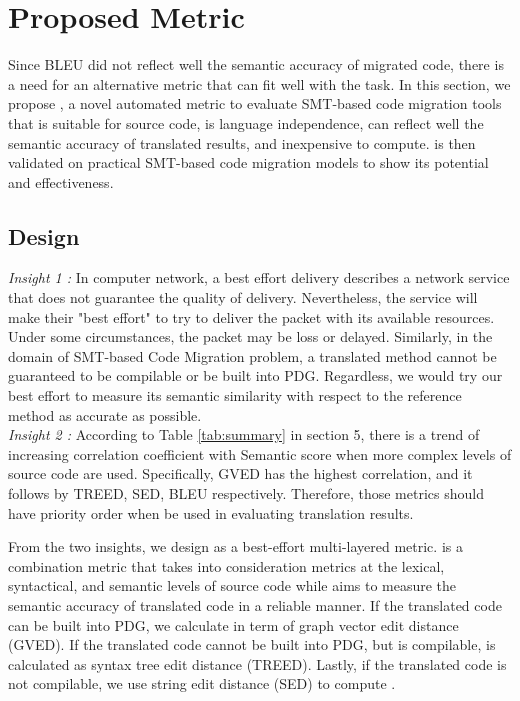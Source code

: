\section{Proposed Metric}
Since BLEU did not reflect well the semantic accuracy of migrated code, there is a need for an alternative metric that can fit well with the task. In this section, we propose {\model}, a novel automated metric to evaluate SMT-based code migration tools that is suitable for source code, is language independence, can reflect well the semantic accuracy of translated results, and inexpensive to compute. {\model} is then validated on practical SMT-based code migration models to show its potential and effectiveness. 
 
\subsection{Design}
\emph{Insight 1 :} In computer network, a best effort delivery describes a network service that does not guarantee the quality of delivery. Nevertheless, the service will make their "best effort" to try to deliver the packet with its available resources. Under some circumstances, the packet may be loss or delayed. Similarly, in the domain of SMT-based Code Migration problem, a translated method cannot be guaranteed to be compilable or be built into PDG. Regardless, we would try our best effort to measure its semantic similarity with respect to the reference method as accurate as possible. \\
\emph{Insight 2 :}
According to Table \ref{tab:summary} in section 5, there is a trend of increasing correlation coefficient with Semantic score when more complex levels of source code are used. Specifically, GVED has the highest correlation, and it follows by TREED, SED, BLEU respectively. Therefore, those metrics should have priority order when be used in evaluating translation results.  

From the two insights, we design {\model} as a best-effort multi-layered metric. {\model} is a combination metric that takes into consideration metrics at the lexical, syntactical, and semantic levels of source code while aims to measure the semantic accuracy of translated code in a reliable manner. If the translated code can be built into PDG, we calculate {\model} in term of graph vector edit distance (GVED). If the translated code cannot be built into PDG, but is compilable, {\model} is calculated as syntax tree edit distance (TREED). Lastly, if the translated code is not compilable, we use string edit distance (SED) to compute {\model}.

